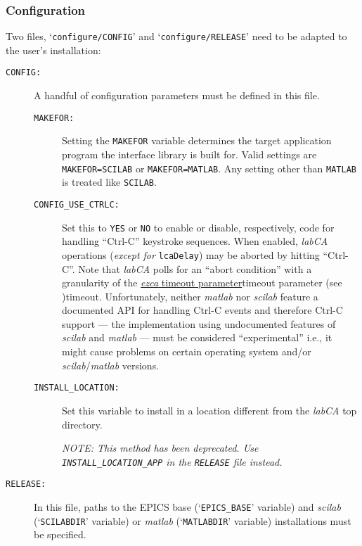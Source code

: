\documentclass{article}
\newcommand{\sca}{\ita{labCA}}
\newcommand{\scilab}{\ita{scilab}}
\newcommand{\matlab}{\ita{matlab}}
\newcommand{\ezca}{\ita{ezca}}
\newcommand{\com}[1]{{\tt #1}}
\newcommand{\ita}[1]{\emph{#1}}
\begin{document}
\subsubsection{Configuration}
Two files, `\com{configure/CONFIG}' and `\com{configure/RELEASE}' need to
be adapted to the user's installation:
\begin{description}
\item[\tt CONFIG:] A handful of configuration parameters must be defined
in this file.
\begin{description}
\item[\tt MAKEFOR:] Setting the \com{MAKEFOR} variable
determines the target application program the interface library is
built for. Valid settings are \com{MAKEFOR=SCILAB} or \com{MAKEFOR=MATLAB}.
Any setting other than \com{MATLAB} is treated like \com{SCILAB}.

\item[\tt CONFIG\_USE\_CTRLC:] Set this to {\tt YES} or {\tt NO} to enable
or disable, respectively, code for handling ``Ctrl-C'' keystroke sequences.
When enabled, \sca{} operations ({\em except for} \com{lcaDelay}) may be aborted
by hitting ``Ctrl-C''.
Note that \sca{} polls for an ``abort condition'' with a granularity of the
\hyperref[ref]{\ezca{} timeout parameter}{timeout parameter (see }{ )}{timeout}.
Unfortunately, neither \matlab{} nor \scilab{} feature a documented API for handling
Ctrl-C events and therefore Ctrl-C support --- the implementation using undocumented
features of \scilab{} and \matlab{} --- must be considered ``experimental''
i.e., it might cause problems on certain operating system and/or \scilab/\matlab{}
versions.

\item[\tt INSTALL\_LOCATION:] Set this variable to install in a location
different from the \sca{} top directory.

{\em NOTE: This method has been
deprecated. Use \com{INSTALL\_LOCATION\_APP} in the \com{RELEASE} file
instead.}
\end{description}
%
%
\item[\tt RELEASE:] In this file, paths to the EPICS base (`\com{EPICS\_BASE}'
variable) and \scilab{} (`\com{SCILABDIR}' variable) or \matlab{} (`\com{MATLABDIR}'
variable) installations must be specified.


\end{description}
\end{document}
